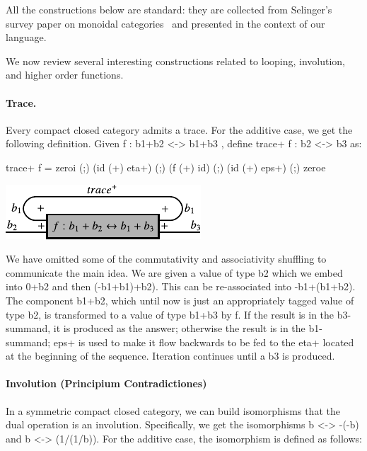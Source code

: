 \documentclass[preprint]{sigplanconf}
\begin{document}
All the constructions below are standard: they are collected from Selinger's
survey paper on monoidal
categories~\cite{springerlink:10.1007/978-3-642-12821-94} and presented in
the context of our language. 

We now review several interesting constructions related to looping,
involution, and higher order functions. 

\paragraph*{Trace.}
Every compact closed category admits a trace. For the additive case, we get
the following definition.  Given {{f : b1+b2 <-> b1+b3 }}, 
define {{trace+ f : b2 <-> b3}} as:

{{ trace+ f = zeroi (;) (id (+) eta+) (;) (f (+) id) (;) (id (+) eps+) (;) zeroe }} 

\begin{center}
  \includegraphics{diagrams/thesis/trace_plus.pdf}
\end{center}  

\noindent We have omitted some of the commutativity and associativity
shuffling to communicate the main idea. We are given a value of type
{{b2}} which we embed into {{0+b2}} and then {{(-b1+b1)+b2)}}. This
can be re-associated into {{-b1+(b1+b2)}}. The component {{b1+b2}},
which until now is just an appropriately tagged value of type {{b2}},
is transformed to a value of type {{b1+b3}} by {{f}}. 
If the result is in the {{b3}}-summand, it is produced as
the answer; otherwise the result is in the {{b1}}-summand; {{eps+}} is
used to make it flow backwards to be fed to the {{eta+}} located at
the beginning of the sequence. Iteration continues until a {{b3}} is
produced.


\paragraph*{Involution (Principium Contradictiones)}

In a symmetric compact closed category, we can build isomorphisms that the
dual operation is an involution. Specifically, we get the isomorphisms 
{{b <-> -(-b)}} and {{b <-> (1/(1/b))}}. For the additive case, the 
isomorphism is defined as follows:
\end{document}
